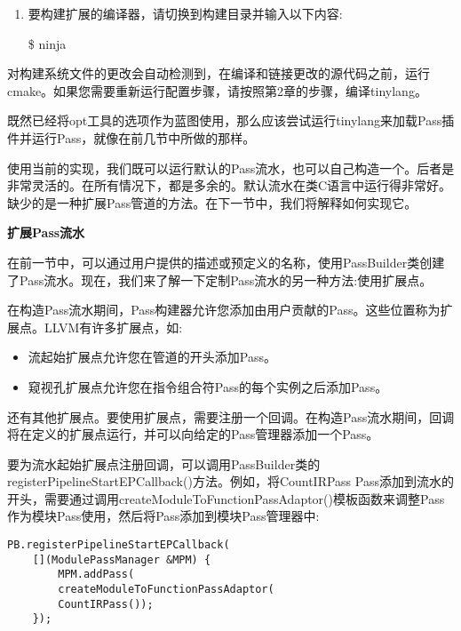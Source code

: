 \begin{enumerate}
\item 要构建扩展的编译器，请切换到构建目录并输入以下内容:
\begin{tcolorbox}[colback=white,colframe=black]
\$ ninja
\end{tcolorbox}
\end{enumerate}

对构建系统文件的更改会自动检测到，在编译和链接更改的源代码之前，运行cmake。如果您需要重新运行配置步骤，请按照第2章的步骤，编译tinylang。\par

既然已经将opt工具的选项作为蓝图使用，那么应该尝试运行tinylang来加载Pass插件并运行Pass，就像在前几节中所做的那样。\par

使用当前的实现，我们既可以运行默认的Pass流水，也可以自己构造一个。后者是非常灵活的。在所有情况下，都是多余的。默认流水在类C语言中运行得非常好。缺少的是一种扩展Pass管道的方法。在下一节中，我们将解释如何实现它。\par



\hspace*{\fill} \par %
\textbf{扩展Pass流水}


在前一节中，可以通过用户提供的描述或预定义的名称，使用PassBuilder类创建了Pass流水。现在，我们来了解一下定制Pass流水的另一种方法:使用扩展点。\par

在构造Pass流水期间，Pass构建器允许您添加由用户贡献的Pass。这些位置称为扩展点。LLVM有许多扩展点，如:\par

\begin{itemize}
\item 流起始扩展点允许您在管道的开头添加Pass。
\item 窥视孔扩展点允许您在指令组合符Pass的每个实例之后添加Pass。
\end{itemize}

还有其他扩展点。要使用扩展点，需要注册一个回调。在构造Pass流水期间，回调将在定义的扩展点运行，并可以向给定的Pass管理器添加一个Pass。\par

要为流水起始扩展点注册回调，可以调用PassBuilder类的registerPipelineStartEPCallback()方法。例如，将CountIRPass Pass添加到流水的开头，需要通过调用createModuleToFunctionPass\allowbreak Adaptor()模板函数来调整Pass作为模块Pass使用，然后将Pass添加到模块Pass管理器中:\par

\begin{lstlisting}[caption={}]
PB.registerPipelineStartEPCallback(
	[](ModulePassManager &MPM) {
		MPM.addPass(
		createModuleToFunctionPassAdaptor(
		CountIRPass());
	});
\end{lstlisting}

